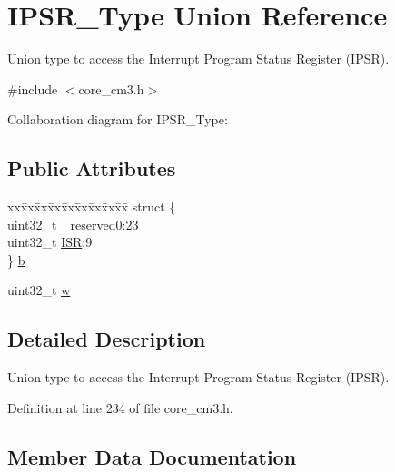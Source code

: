 \hypertarget{unionIPSR__Type}{}\section{I\+P\+S\+R\+\_\+\+Type Union Reference}
\label{unionIPSR__Type}


Union type to access the Interrupt Program Status Register (I\+P\+SR).  




{\ttfamily \#include $<$core\+\_\+cm3.\+h$>$}



Collaboration diagram for I\+P\+S\+R\+\_\+\+Type\+:
\subsection*{Public Attributes}
\begin{DoxyCompactItemize}
\item 
\begin{tabbing}
xx\=xx\=xx\=xx\=xx\=xx\=xx\=xx\=xx\=\kill
struct \{\\
\>uint32\_t \hyperlink{unionIPSR__Type_ad2eb0a06de4f03f58874a727716aa9aa}{\_reserved0}:23\\
\>uint32\_t \hyperlink{unionIPSR__Type_ab46e5f1b2f4d17cfb9aca4fffcbb2fa5}{ISR}:9\\
\} \hyperlink{unionIPSR__Type_add0d6497bd50c25569ea22b48a03ec50}{b}\\

\end{tabbing}\item 
uint32\+\_\+t \hyperlink{unionIPSR__Type_a4adca999d3a0bc1ae682d73ea7cfa879}{w}
\end{DoxyCompactItemize}


\subsection{Detailed Description}
Union type to access the Interrupt Program Status Register (I\+P\+SR). 

Definition at line 234 of file core\+\_\+cm3.\+h.



\subsection{Member Data Documentation}
